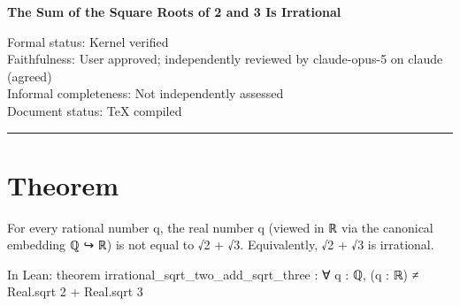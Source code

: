 \documentclass[11pt]{article}
\begin{document}
\begin{center}
{\LARGE\color{HardyBlue}\bfseries The Sum of the Square Roots of 2 and 3 Is Irrational\par}
\vspace{1em}
Formal status: Kernel verified\\
Faithfulness: User approved; independently reviewed by claude-opus-5 on claude (agreed)\\
Informal completeness: Not independently assessed\\
Document status: TeX compiled
\end{center}

\hrule
\vspace{1em}

\section*{Theorem}
For every rational number q, the real number q (viewed in ℝ via the canonical embedding ℚ ↪ ℝ) is not equal to √2 + √3. Equivalently, √2 + √3 is irrational.

In Lean: theorem irrational\_sqrt\_two\_add\_sqrt\_three : ∀ q : ℚ, (q : ℝ) ≠ Real.sqrt 2 + Real.sqrt 3
\end{document}
